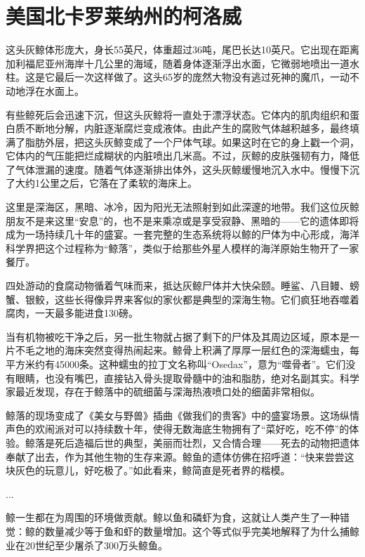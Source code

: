 \documentclass[12pt,oneside]{book}
\begin{document}
\section{美国北卡罗莱纳州的柯洛威}
\begin{bookref}[frametitle={\cite{好好告别：世界葬礼观察手记}}]

这头灰鲸体形庞大，身长55英尺，体重超过36吨，尾巴长达10英尺。它出现在距离加利福尼亚州海岸十几公里的海域，随着身体逐渐浮出水面，它微弱地喷出一道水柱。这是它最后一次这样做了。这头65岁的庞然大物没有逃过死神的魔爪，一动不动地浮在水面上。

有些鲸死后会迅速下沉，但这头灰鲸将一直处于漂浮状态。它体内的肌肉组织和蛋白质不断地分解，内脏逐渐腐烂变成液体。由此产生的腐败气体越积越多，最终填满了脂肪外层，把这头灰鲸变成了一个尸体气球。如果这时在它的身上戳一个洞，它体内的气压能把烂成糊状的内脏喷出几米高。不过，灰鲸的皮肤强韧有力，降低了气体泄漏的速度。随着气体逐渐排出体外，这头灰鲸缓慢地沉入水中。慢慢下沉了大约1公里之后，它落在了柔软的海床上。

这里是深海区，黑暗、冰冷，因为阳光无法照射到如此深邃的地带。我们这位灰鲸朋友不是来这里“安息”的，也不是来乘凉或是享受寂静、黑暗的——它的遗体即将成为一场持续几十年的盛宴。一套完整的生态系统将以鲸的尸体为中心形成，海洋科学界把这个过程称为“鲸落”，类似于给那些外星人模样的海洋原始生物开了一家餐厅。

四处游动的食腐动物循着气味而来，抵达灰鲸尸体并大快朵颐。睡鲨、八目鳗、螃蟹、银鲛，这些长得像异界来客似的家伙都是典型的深海生物。它们疯狂地吞噬着腐肉，一天最多能进食130磅。

当有机物被吃干净之后，另一批生物就占据了剩下的尸体及其周边区域，原本是一片不毛之地的海床突然变得热闹起来。鲸骨上积满了厚厚一层红色的深海蠕虫，每平方米约有45000条。这种蠕虫的拉丁文名称叫“Osedax”，意为“噬骨者”。它们没有眼睛，也没有嘴巴，直接钻入骨头提取骨髓中的油和脂肪，绝对名副其实。科学家最近发现，存在于鲸落中的硫细菌与深海热液喷口处的细菌非常相似。

鲸落的现场变成了《美女与野兽》插曲《做我们的贵客》中的盛宴场景。这场纵情声色的欢闹派对可以持续数十年，使得无数海底生物拥有了“菜好吃，吃不停”的体验。鲸落是死后造福后世的典型，美丽而壮烈，又合情合理——死去的动物把遗体奉献了出去，作为其他生物的生存来源。鲸鱼的遗体仿佛在招呼道：“快来尝尝这块灰色的玩意儿，好吃极了。”如此看来，鲸简直是死者界的楷模。

...

鲸一生都在为周围的环境做贡献。鲸以鱼和磷虾为食，这就让人类产生了一种错觉：鲸的数量减少等于鱼和虾的数量增加。这个等式似乎完美地解释了为什么捕鲸业在20世纪至少屠杀了300万头鲸鱼。


\end{bookref}
\end{document}
